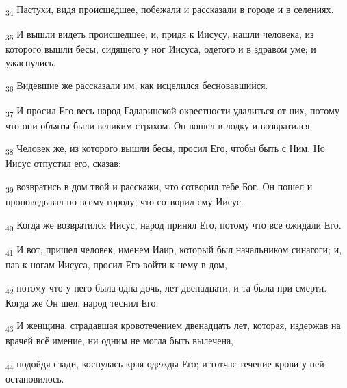\begin{tcolorbox}
\textsubscript{34} Пастухи, видя происшедшее, побежали и рассказали в городе и в селениях.
\end{tcolorbox}
\begin{tcolorbox}
\textsubscript{35} И вышли видеть происшедшее; и, придя к Иисусу, нашли человека, из которого вышли бесы, сидящего у ног Иисуса, одетого и в здравом уме; и ужаснулись.
\end{tcolorbox}
\begin{tcolorbox}
\textsubscript{36} Видевшие же рассказали им, как исцелился бесновавшийся.
\end{tcolorbox}
\begin{tcolorbox}
\textsubscript{37} И просил Его весь народ Гадаринской окрестности удалиться от них, потому что они объяты были великим страхом. Он вошел в лодку и возвратился.
\end{tcolorbox}
\begin{tcolorbox}
\textsubscript{38} Человек же, из которого вышли бесы, просил Его, чтобы быть с Ним. Но Иисус отпустил его, сказав:
\end{tcolorbox}
\begin{tcolorbox}
\textsubscript{39} возвратись в дом твой и расскажи, что сотворил тебе Бог. Он пошел и проповедывал по всему городу, что сотворил ему Иисус.
\end{tcolorbox}
\begin{tcolorbox}
\textsubscript{40} Когда же возвратился Иисус, народ принял Его, потому что все ожидали Его.
\end{tcolorbox}
\begin{tcolorbox}
\textsubscript{41} И вот, пришел человек, именем Иаир, который был начальником синагоги; и, пав к ногам Иисуса, просил Его войти к нему в дом,
\end{tcolorbox}
\begin{tcolorbox}
\textsubscript{42} потому что у него была одна дочь, лет двенадцати, и та была при смерти. Когда же Он шел, народ теснил Его.
\end{tcolorbox}
\begin{tcolorbox}
\textsubscript{43} И женщина, страдавшая кровотечением двенадцать лет, которая, издержав на врачей всё имение, ни одним не могла быть вылечена,
\end{tcolorbox}
\begin{tcolorbox}
\textsubscript{44} подойдя сзади, коснулась края одежды Его; и тотчас течение крови у ней остановилось.
\end{tcolorbox}
